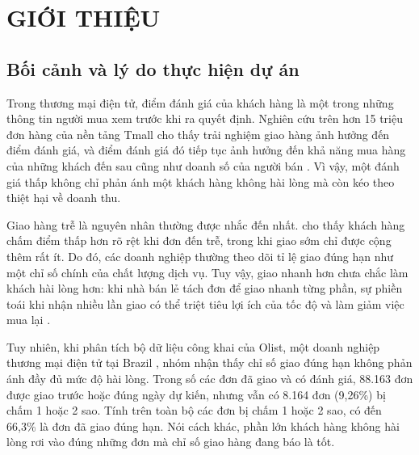 
\section{GIỚI THIỆU}

\subsection{Bối cảnh và lý do thực hiện dự án}

Trong thương mại điện tử, điểm đánh giá của khách hàng là một trong những thông tin
người mua xem trước khi ra quyết định. Nghiên cứu trên hơn 15 triệu đơn hàng của nền
tảng Tmall cho thấy trải nghiệm giao hàng ảnh hưởng đến điểm đánh giá, và điểm đánh giá
đó tiếp tục ảnh hưởng đến khả năng mua hàng của những khách đến sau cũng như doanh số
của người bán \parencite{deshpande2023}. Vì vậy, một đánh giá thấp không chỉ phản ánh
một khách hàng không hài lòng mà còn kéo theo thiệt hại về doanh thu.

Giao hàng trễ là nguyên nhân thường được nhắc đến nhất. \textcite{ravula2023} cho thấy
khách hàng chấm điểm thấp hơn rõ rệt khi đơn đến trễ, trong khi giao sớm chỉ được cộng
thêm rất ít. Do đó, các doanh nghiệp thường theo dõi tỉ lệ giao đúng hạn như một chỉ số
chính của chất lượng dịch vụ. Tuy vậy, giao nhanh hơn chưa chắc làm khách hài lòng hơn:
khi nhà bán lẻ tách đơn để giao nhanh từng phần, sự phiền toái khi nhận nhiều lần giao
có thể triệt tiêu lợi ích của tốc độ và làm giảm việc mua lại \parencite{brylla2022}.

Tuy nhiên, khi phân tích bộ dữ liệu công khai của Olist, một doanh nghiệp thương mại
điện tử tại Brazil \parencite{olist2018}, nhóm nhận thấy chỉ số giao đúng hạn không phản
ánh đầy đủ mức độ hài lòng. Trong số các đơn đã giao và có đánh giá, 88.163 đơn được giao
trước hoặc đúng ngày dự kiến, nhưng vẫn có 8.164 đơn (9,26\%) bị chấm 1 hoặc 2 sao. Tính
trên toàn bộ các đơn bị chấm 1 hoặc 2 sao, có đến 66,3\% là đơn đã giao đúng hạn. Nói cách
khác, phần lớn khách hàng không hài lòng rơi vào đúng những đơn mà chỉ số giao hàng đang
báo là tốt.

